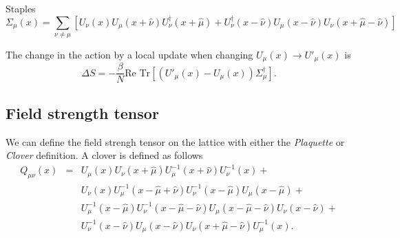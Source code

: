 \documentclass[12pt,a4paper]{article}
\begin{document}
Staples
\begin{equation}
	\label{eq:staples}
	\Sigma_{\mu}(x) = \sum_{\nu \neq \mu} \left[ U_{\nu}(x)U_{\mu}(x+\hat{\nu})U_{\nu}^{\dagger}(x+\hat{\mu}) + U_{\nu}^{\dagger}(x-\hat{\nu})U_{\mu}(x-\hat{\nu})U_{\nu}(x+\hat{\mu}-\hat{\nu})\right]
\end{equation}


The change in the action  by a local update when changing $U_{\mu}(x) \to U'_{\mu}(x)$ is
\begin{equation}
	\label{eq:DS}
	\Delta S = -\frac{\beta}{N} \text{Re } \text{Tr} \left[ \left( U'_{\mu}(x) - U_{\mu}(x) \right)\Sigma_{\mu}^{\dagger}\right].
\end{equation}

\subsection{Field strength tensor}

We can define the field strengh tensor on the lattice with either the \emph{Plaquette} or \emph{Clover} definition. A clover is defined as follows
\begin{eqnarray}
    Q_{\mu\nu}(x) & = & U_{\mu}(x)U_{\nu}(x+\hat{\mu})U_{\mu}^{-1}(x+\hat{\nu})U_{\nu}^{-1}(x)  +  \nonumber\\
    & & U_{\nu}(x)U_{\mu}^{-1}(x-\hat{\mu}+\hat{\nu})U_{\nu}^{-1}(x-\hat{\mu})U_{\mu}(x-\hat{\mu})  + \nonumber\\ 
    & & U_{\mu}^{-1}(x-\hat{\mu})U_{\nu}^{-1}(x-\hat{\mu}-\hat{\nu})U_{\mu}(x-\hat{\mu}-\hat{\nu})U_{\nu}(x-\hat{\nu})+\nonumber\\
    &  & U_{\nu}^{-1}(x-\hat{\nu}) U_{\mu}(x-\hat{\nu})U_{\nu}(x+\hat{\mu}-\hat{\nu})U_{\mu}^{-1}(x).
\end{eqnarray}
\end{document}
